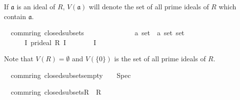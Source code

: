 \documentclass[12pt]{scrartcl}
\begin{document}
If $\mathfrak{a}$ is an ideal of $R$, $V(\mathfrak{a})$ will denote the set of all prime ideals of $R$ which contain $\mathfrak{a}$. 

\begin{isabelle}
\isamarkupfalse%
\ {\isacharparenleft}{\kern0pt}\ comm{\isacharunderscore}{\kern0pt}ring{\isacharparenright}{\kern0pt}\ closed{\isacharunderscore}{\kern0pt}subsets\isanewline
\ \ \ \ \ \ \ \ \ \ \ \ \ {\isacharcolon}{\kern0pt}{\isacharcolon}{\kern0pt}\ {\isachardoublequoteopen}{\isacharprime}{\kern0pt}a\ set\ {\isasymRightarrow}\ {\isacharparenleft}{\kern0pt}{\isacharprime}{\kern0pt}a\ set{\isacharparenright}{\kern0pt}\ set{\isachardoublequoteclose}\ {\isacharparenleft}{\kern0pt}{\isachardoublequoteopen}{\isasymV}\ {\isacharunderscore}{\kern0pt}{\isachardoublequoteclose}\ {\isacharbrackleft}{\kern0pt}{}{}{}{\isacharbrackright}{\kern0pt}\ {}{}{}{\isacharparenright}{\kern0pt}\isanewline
\ \ \ {\isachardoublequoteopen}{\isasymV}\ {\isasymaa}\ {\isasymequiv}\ {\isacharbraceleft}{\kern0pt}I{\isachardot}{\kern0pt}\ pr{\isacharunderscore}{\kern0pt}ideal\ R\ I\ {\isacharparenleft}{\kern0pt}{\isacharplus}{\kern0pt}{\isacharparenright}{\kern0pt}\ {\isacharparenleft}{\kern0pt}{\isasymcdot}{\isacharparenright}{\kern0pt}\ {\isasymzero}\ {\isasymone}\ {\isasymand}\ {\isasymaa}\ {\isasymsubseteq}\ I{\isacharbraceright}{\kern0pt}{\isachardoublequoteclose}
\end{isabelle}

Note that $V(R) = \emptyset$ and $V(\lbrace 0 \rbrace)$ is the set of all prime ideals of $R$.

\begin{isabelle}
\isamarkupfalse%
\ {\isacharparenleft}{\kern0pt}\ comm{\isacharunderscore}{\kern0pt}ring{\isacharparenright}{\kern0pt}\ closed{\isacharunderscore}{\kern0pt}subsets{\isacharunderscore}{\kern0pt}empty{\isacharcolon}{\kern0pt}\ {\isachardoublequoteopen}{\isasymV}\ {\isacharbraceleft}{\kern0pt}{\isacharbraceright}{\kern0pt}\ {\isacharequal}{\kern0pt}\ Spec{\isachardoublequoteclose}
\end{isabelle}

\begin{isabelle}
\isamarkupfalse%
\ {\isacharparenleft}{\kern0pt}\ comm{\isacharunderscore}{\kern0pt}ring{\isacharparenright}{\kern0pt}\ closed{\isacharunderscore}{\kern0pt}subsets{\isacharunderscore}{\kern0pt}R{\isacharcolon}{\kern0pt}\ {\isachardoublequoteopen}{\isasymV}\ R\ {\isacharequal}{\kern0pt}\ {\isacharbraceleft}{\kern0pt}{\isacharbraceright}{\kern0pt}{\isachardoublequoteclose}
\end{isabelle}
\end{document}

